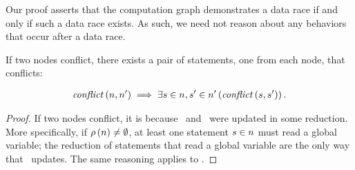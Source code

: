 Our proof asserts that the computation graph demonstrates a data race
if and only if such a data race exists. As such, we need not reason
about any behaviors that occur after a data race.

\begin{comment}
\begin{definition}[Schedule]
A schedule is a series of states that starts with the initial state
$\st_{0}$. Each state can be derived from its predecessor in the
schedule:

\begin{gather*}
\tuple{\st_{0}, \st_{1}, \ldots, \st} \text{ where } \st_{0}
\rightarrow \st_{1} \rightarrow \ldots \rightarrow \st .
\end{gather*}
\end{definition}

\begin{definition}[Race-free schedule]
A race-free schedule is a schedule that contains only race-free
reductions.
\end{definition}

Data races occur, in one sense, as an interaction between two
different reductions. However, a single reduction is sufficient to
influence downstream behaviors. It is possible to reason about all
race-free schedules without enumerating them.

\begin{definition}[Race-free state]
A race-free state \rf{\st} is a state in a race-free schedule.
\end{definition}
\end{comment}

\begin{lemma}
\label{lemma:conflict-sound}
If two nodes conflict, there exists a pair of statements, one from
each node, that conflicts:

\begin{gather*}
\mathit{conflict}\left(n, n'\right) \implies \exists
s \in n, s' \in n'
\left(\mathit{conflict}\left(s, s'\right)\right) .
\end{gather*}
\end{lemma}

\begin{proof}
If two nodes conflict, it is because \rv\ and \wv\ were updated in
some reduction. More specifically, if $\rho\left(n\right) \ne
\emptyset$, at least one statement $s \in n$ must read a
global variable; the reduction of statements that read a global
variable are the only way that \rv\ updates. The same reasoning
applies to \wv.
\end{proof}

